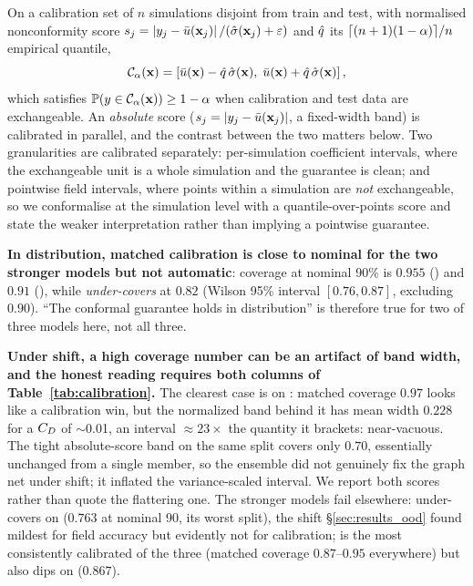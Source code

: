 On a calibration set of $n$ simulations disjoint from train and test, with
normalised nonconformity score
$s_j = \left\lvert y_j - \bar{u}(\mathbf{x}_j) \right\rvert / (\hat{\sigma}(\mathbf{x}_j) + \varepsilon)$ and $\hat{q}$ its
$\lceil (n+1)(1-\alpha) \rceil / n$ empirical quantile,
\begin{equation}
  \mathcal{C}_{\alpha}(\mathbf{x}) = \left[ \bar{u}(\mathbf{x}) - \hat{q}\,\hat{\sigma}(\mathbf{x}),\;
                      \bar{u}(\mathbf{x}) + \hat{q}\,\hat{\sigma}(\mathbf{x}) \right],
\end{equation}
which satisfies $\mathbb{P}(y \in \mathcal{C}_{\alpha}(\mathbf{x})) \geq 1-\alpha$ when calibration and
test data are exchangeable. An \emph{absolute} score
($s_j = \left\lvert y_j - \bar{u}(\mathbf{x}_j) \right\rvert$, a fixed-width band) is calibrated in
parallel, and the contrast between the two matters below. Two granularities are
calibrated separately: per-simulation coefficient intervals, where the
exchangeable unit is a whole simulation and the guarantee is clean; and
pointwise field intervals, where points within a simulation are \emph{not}
exchangeable, so we conformalise at the simulation level with a
quantile-over-points score and state the weaker interpretation rather than
implying a pointwise guarantee.

\textbf{In distribution, matched calibration is close to nominal for the two
stronger models but not automatic}: coverage at nominal 90\% is $0.955$
(\Mfno) and $0.91$ (\Mtrans), while \Mgnn{} \emph{under-covers} at $0.82$
(Wilson 95\% interval $[0.76, 0.87]$, excluding $0.90$). ``The conformal
guarantee holds in distribution'' is therefore true for two of three models
here, not all three.

\textbf{Under shift, a high coverage number can be an artifact of band width,
and the honest reading requires both columns of Table~\ref{tab:calibration}.}
The clearest case is \Mgnn{} on : matched coverage $0.97$
looks like a calibration win, but the normalized band behind it has mean width
$0.228$ for a $C_D$ of $\sim$0.01, an interval $\approx23\times$ the quantity
it brackets: near-vacuous. The tight absolute-score band on the same split
covers only $0.70$, essentially unchanged from a single member, so the
ensemble did not genuinely fix the graph net under shift; it inflated the
variance-scaled interval. We report both scores rather than quote the
flattering one. The stronger models fail elsewhere: \Mfno{} under-covers on
 ($0.763$ at nominal 90, its worst split), the shift
\S\ref{sec:results_ood} found mildest for field accuracy but evidently not for
calibration; \Mtrans{} is the most consistently calibrated of the three
(matched coverage $0.87$--$0.95$ everywhere) but also dips on
 ($0.867$).

